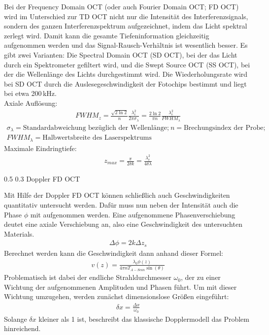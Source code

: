 \documentclass[german, %
parskip=full, %
bibliography=totoc, %
]{scrartcl}
\makeatletter
\renewcommand\subsection{\@startsection 
   {subsection}{2}{0mm}%
   {0.5\baselineskip}%
   {0.3\baselineskip}%
   {\bfseries\sffamily\large}%
   }
\makeatother
\begin{document}
Bei der Frequency Domain OCT (oder auch Fourier Domain OCT; FD OCT) wird im Unterschied zur TD OCT nicht nur die Intensität des Interferenzsignals, sondern des ganzen Interferenzspektrum aufgezeichnet, indem das Licht spektral zerlegt wird. Damit kann die gesamte Tiefeninformation gleichzeitig aufgenommen werden und das Signal-Rausch-Verhältnis ist wesentlich besser. Es gibt zwei Varianten: Die Spectral Domain OCT (SD OCT), bei der das Licht durch ein Spektrometer gefiltert wird, und die Swept Source OCT (SS OCT), bei der die Wellenlänge des Lichts durchgestimmt wird. Die Wiederholungsrate wird bei SD OCT durch die Auslesegeschwindigkeit der Fotochips bestimmt und liegt bei etwa 200\,kHz. \\
Axiale Auflösung:
\begin{align}
FWHM_z = \frac{\sqrt{2 \ln 2}}{n}\frac{\lambda_c^2}{2 \pi \sigma_\lambda} = \frac{2 \ln 2}{\pi n}\frac{\lambda_c^2}{FWHM_\lambda} 
\end{align}
\begin{align*}
\sigma_\lambda = \text{Standardabweichung bezüglich der Wellenlänge;} \ n = \text{Brechungsindex der Probe;} \\ FWHM_\lambda = \text{Halbwertsbreite des Laserspektrums}
\end{align*}
Maximale Eindringtiefe:
\begin{align}
z_{max} = \frac{\pi}{2 \delta k} = \frac{\lambda_c^2}{4 \delta \lambda}
\end{align}

\subsection{Doppler FD OCT}

Mit Hilfe der Doppler FD OCT können schließlich auch Geschwindigkeiten quantitativ untersucht werden. Dafür muss nun neben der Intensität auch die Phase $\phi$ mit aufgenommen werden. Eine aufgenommene Phasenverschiebung deutet eine axiale Verschiebung an, also eine Geschwindigkeit des untersuchten Materials.
\begin{align}
\Delta \phi = 2 k \Delta z_s
\end{align}
Berechnet werden kann die Geschwindigkeit dann anhand dieser Formel:
\begin{align}
v(z) = \frac{\lambda_0 \phi (z)}{4 \pi n T_{A-Scan} \sin (\theta)}
\end{align}
Problematisch ist dabei der endliche Strahldurchmesser $\omega_0$, der zu einer Wichtung der aufgenommenen Amplituden und Phasen führt. Um mit dieser Wichtung umzugehen, werden zunächst dimensionslose Größen eingeführt:
\begin{align}
\delta x = \frac{\Delta x}{\omega _0}
\end{align}
Solange $\delta x$ kleiner als 1 ist, beschreibt das klassische Dopplermodell das Problem hinreichend.
\end{document}

